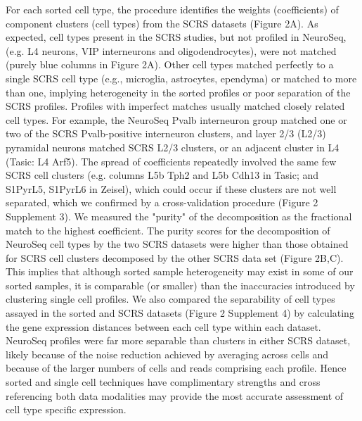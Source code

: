 For each sorted cell type, the procedure identifies the weights (coefficients) of  component clusters (cell types) from the SCRS datasets (Figure 2A). As expected, cell types present in the SCRS studies, but not profiled in NeuroSeq, (e.g. L4 neurons, VIP interneurons and oligodendrocytes), were not matched (purely blue columns in Figure 2A). Other cell types matched perfectly to a single SCRS cell type (e.g., microglia, astrocytes, ependyma) or matched to more than one, implying heterogeneity in the sorted profiles or poor separation of the SCRS profiles. Profiles with imperfect matches usually matched closely related cell types. For example, the NeuroSeq Pvalb interneuron group matched one or two of the SCRS Pvalb-positive interneuron clusters, and layer 2/3 (L2/3) pyramidal neurons matched SCRS L2/3 clusters, or an adjacent cluster in L4 (Tasic: L4 Arf5). The spread of coefficients repeatedly involved the same few SCRS cell clusters (e.g. columns L5b Tph2 and L5b Cdh13 in Tasic; and S1PyrL5,  S1PyrL6 in Zeisel), which could occur if these clusters are not well separated, which we confirmed by a cross-validation procedure (Figure 2 Supplement 3). We measured the "purity" of the decomposition as the fractional match to the highest coefficient. The purity scores for the decomposition of NeuroSeq cell types by the two SCRS datasets were higher than those obtained for SCRS cell clusters decomposed by the other SCRS data set (Figure 2B,C). This implies that although sorted sample heterogeneity may exist in some of our sorted samples, it is comparable (or smaller) than the inaccuracies introduced by clustering single cell profiles. We also compared the separability of cell types assayed in the sorted and SCRS datasets (Figure 2 Supplement 4) by calculating the gene expression distances between each cell type within each dataset. NeuroSeq profiles were far more separable than clusters in either SCRS dataset, likely because of the noise reduction achieved by averaging across cells and because of the larger numbers of cells and reads comprising each profile. Hence sorted and single cell techniques have complimentary strengths and cross referencing both data modalities may provide the most accurate assessment of cell type specific expression. 



